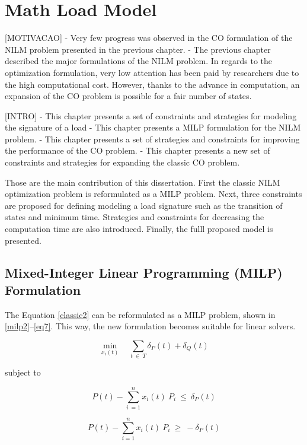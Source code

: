 
\chapter{Math Load Model}

[MOTIVACAO]
- Very few progress was observed in the CO formulation of the NILM problem presented in the previous chapter. 
- The previous chapter described the major formulations of the NILM problem. In regards to the optimization formulation, very low attention has been paid by researchers due to the high computational cost. However, thanks to the advance in computation, an expansion of the CO problem is possible for a fair number of states. 

[INTRO]
- This chapter presents a set of constraints and strategies for modeling the signature of a load
- This chapter presents a MILP formulation for the NILM problem. 
- This chapter presents a set of strategies and constraints for improving the performance of the CO problem. 
- This chapter presents a new set of constraints and strategies for expanding the classic CO problem. 


Those are the main contribution of this dissertation. First the classic NILM optimization problem is reformulated as a MILP problem. Next, three constraints are proposed for defining modeling a load signature such as the transition of states and minimum time. Strategies and constraints for decreasing the computation time are also introduced. Finally, the fulll proposed model is presented. 

\section{Mixed-Integer Linear Programming (MILP) Formulation}

The Equation \eqref{classic2} can be reformulated as a MILP problem, shown in \eqref{milp2}--\eqref{eq7}. This way, the new formulation becomes suitable for linear solvers.

\begin{equation} \label{milp2}
    \min_{x_i(t)} \quad \sum_{t\ \in\ T} \delta_P(t) + \delta_Q(t)
\end{equation}

subject to 

\begin{equation} \label{eq65}
    P(t) - \sum_{i\ = 1}^{n} x_i(t)\ P_i \ \leq \ \delta_P(t) 
\end{equation}

\begin{equation} 
  P(t) - \sum_{i = 1}^{n} x_i(t)\ P_i \ \geq \ -\delta_P(t)
\end{equation}

